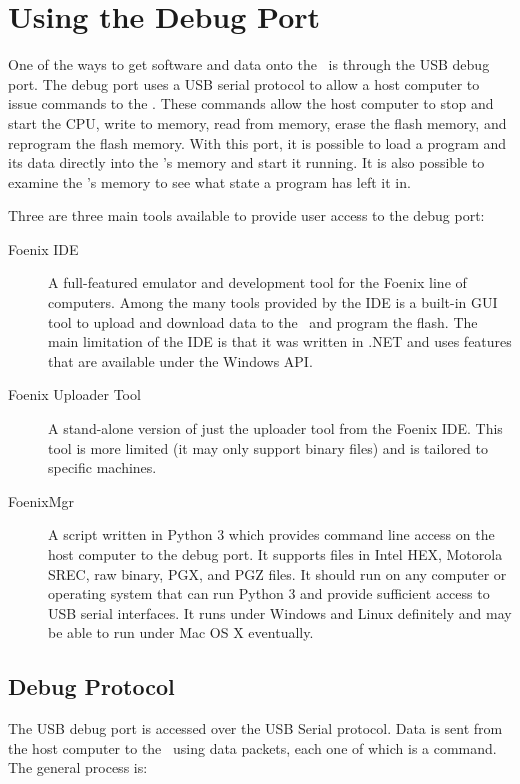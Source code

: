 \chapter{Using the Debug Port}

One of the ways to get software and data onto the \jr\ is through the USB debug port. The debug port uses a USB serial protocol to allow a host computer to issue commands to the \jr. These commands allow the host computer to stop and start the CPU, write to memory, read from memory, erase the flash memory, and reprogram the flash memory. With this port, it is possible to load a program and its data directly into the \jr's memory and start it running. It is also possible to examine the \jr's memory to see what state a program has left it in.

Three are three main tools available to provide user access to the debug port:

\begin{description}
    \item[Foenix IDE] A full-featured emulator and development tool for the Foenix line of computers. Among the many tools provided by the IDE is a built-in GUI tool to upload and download data to the \jr\ and program the flash. The main limitation of the IDE is that it was written in .NET and uses features that are available under the Windows API.

    \item[Foenix Uploader Tool] A stand-alone version of just the uploader tool from the Foenix IDE. This tool is more limited (it may only support binary files) and is tailored to specific machines.

    \item[FoenixMgr] A script written in Python 3 which provides command line access on the host computer to the debug port. It supports files in Intel HEX, Motorola SREC, raw binary, PGX, and PGZ files. It should run on any computer or operating system that can run Python 3 and provide sufficient access to USB serial interfaces. It runs under Windows and Linux definitely and may be able to run under Mac OS X eventually.
\end{description}

\section{Debug Protocol}

The USB debug port is accessed over the USB Serial protocol. Data is sent from the host computer to the \jr\ using data packets, each one of which is a command. The general process is:

